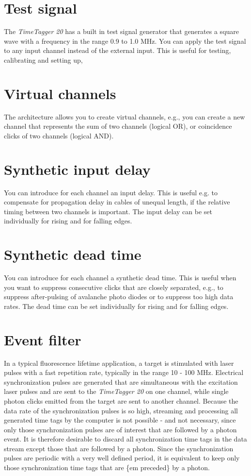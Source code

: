 \documentclass[letterpaper,10pt,english]{sphinxmanual}
\begin{document}
\section{Test signal}
\label{sections/hardware:test-signal}
The \emph{TimeTagger 20} has a built in test signal generator that
generates a square wave with a frequency in the range 0.9 to 1.0 MHz.
You can apply the test signal to any input channel instead of the
external input. This is useful for testing, calibrating and setting up,


\section{Virtual channels}
\label{sections/hardware:virtual-channels}
The architecture allows you to create virtual channels, e.g.,
you can create a new channel that represents the sum of two channels (logical OR),
or coincidence clicks of two channels (logical AND).


\section{Synthetic input delay}
\label{sections/hardware:synthetic-input-delay}
You can introduce for each channel an input delay. This is useful
e.g. to compensate for propagation delay in cables of unequal length,
if the relative timing between two channels is important. The input delay
can be set individually for rising and for falling edges.


\section{Synthetic dead time}
\label{sections/hardware:synthetic-dead-time}
You can introduce for each channel a synthetic dead time. This is useful
when you want to suppress consecutive clicks that are closely separated,
e.g., to suppress after-pulsing of avalanche photo diodes or to suppress too
high data rates. The dead time can be set individually for rising and for falling edges.


\section{Event filter}
\label{sections/hardware:event-filter}
In a typical fluorescence lifetime application, a target is stimulated with laser pulses with
a fast repetition rate, typically in the range 10 - 100 MHz. Electrical synchronization pulses
are generated that are simultaneous with the excitation laser pulses and are sent to
the \emph{TimeTagger 20} on one channel, while single photon clicks emitted from the target are sent to another channel.
Because the data rate of the synchronization pulses is so high, streaming and processing all generated
time tags by the computer is not possible - and not necessary, since only those synchronization
pulses are of interest that are followed by a photon event. It is therefore desirable
to discard all synchronization time tags in the data stream except those that are followed by a photon.
Since the synchronization pulses are periodic with a very well defined period, it is equivalent
to keep only those synchronization time tags that are \{em preceded\} by a photon.
\end{document}
